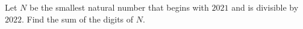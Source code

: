 Let $N$ be the smallest natural number that begins with $2021$ and is divisible by $2022$. Find the sum of the digits of $N$.

